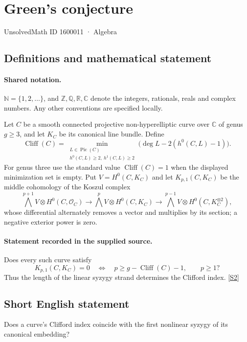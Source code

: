 \documentclass[11pt]{article}
\newcommand{\sref}[2]{\hyperlink{source:#1:#2}{[S#2]}}
\begin{document}
\setcounter{section}{1600010}
\section{Green's conjecture}\label{1600011}
{\small\sffamily UnsolvedMath ID 1600011 · Algebra}
\subsection{Definitions and mathematical statement}

\paragraph{Shared notation.}$\mathbb N=\{1,2,\ldots\}$, and $\mathbb Z,\mathbb Q,\mathbb R,\mathbb C$ denote the integers, rationals, reals and complex numbers. Any other conventions are specified locally.


Let $C$ be a smooth connected projective non-hyperelliptic curve over $\mathbb C$ of genus $g\geq3$, and let $K_C$ be its canonical line bundle. Define
\[\operatorname{Cliff}(C)=\min_{\substack{L\in\operatorname{Pic}(C)\\h^0(C,L)\geq2,\ h^1(C,L)\geq2}}\bigl(\deg L-2(h^0(C,L)-1)\bigr).
\]
For genus three use the standard value $\operatorname{Cliff}(C)=1$ when the displayed minimization set is empty. Put $V=H^0(C,K_C)$ and let $K_{p,1}(C,K_C)$ be the middle cohomology of the Koszul complex
\[\bigwedge^{p+1}V\otimes H^0(C,\mathcal O_C)\longrightarrow\bigwedge^pV\otimes H^0(C,K_C)\longrightarrow\bigwedge^{p-1}V\otimes H^0(C,K_C^{\otimes2}),
\]
whose differential alternately removes a vector and multiplies by its section; a negative exterior power is zero.
\paragraph{Statement recorded in the supplied source.}
Does every such curve satisfy
\[K_{p,1}(C,K_C)=0\quad\Longleftrightarrow\quad p\geq g-\operatorname{Cliff}(C)-1,\qquad p\geq1?
\]
Thus the length of the linear syzygy strand determines the Clifford index. \sref{1600011}{2}
\subsection{Short English statement}
Does a curve’s Clifford index coincide with the first nonlinear syzygy of its canonical embedding?
\end{document}
